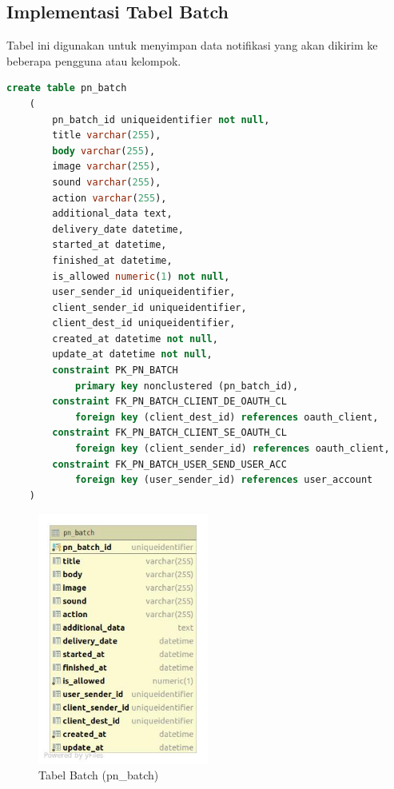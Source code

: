\subsection{Implementasi Tabel Batch}
\par Tabel ini digunakan untuk menyimpan data notifikasi yang akan dikirim ke beberapa pengguna atau kelompok.
\begin{lstlisting}[language=sql, firstnumber=1, caption=Implementasi Tabel Batch]
    create table pn_batch
    (
        pn_batch_id uniqueidentifier not null,
        title varchar(255),
        body varchar(255),
        image varchar(255),
        sound varchar(255),
        action varchar(255),
        additional_data text,
        delivery_date datetime,
        started_at datetime,
        finished_at datetime,
        is_allowed numeric(1) not null,
        user_sender_id uniqueidentifier,
        client_sender_id uniqueidentifier,
        client_dest_id uniqueidentifier,
        created_at datetime not null,
        update_at datetime not null,
        constraint PK_PN_BATCH
            primary key nonclustered (pn_batch_id),
        constraint FK_PN_BATCH_CLIENT_DE_OAUTH_CL
            foreign key (client_dest_id) references oauth_client,
        constraint FK_PN_BATCH_CLIENT_SE_OAUTH_CL
            foreign key (client_sender_id) references oauth_client,
        constraint FK_PN_BATCH_USER_SEND_USER_ACC
            foreign key (user_sender_id) references user_account
    )
\end{lstlisting}
\begin{figure}[H]
    \centering\includegraphics[width=0.5\textwidth]{bab4/figures/tabel_pn_batch.jpg}
    \caption{Tabel Batch (pn\_batch)}
    \label{tabel_pn_batch}
\end{figure}

